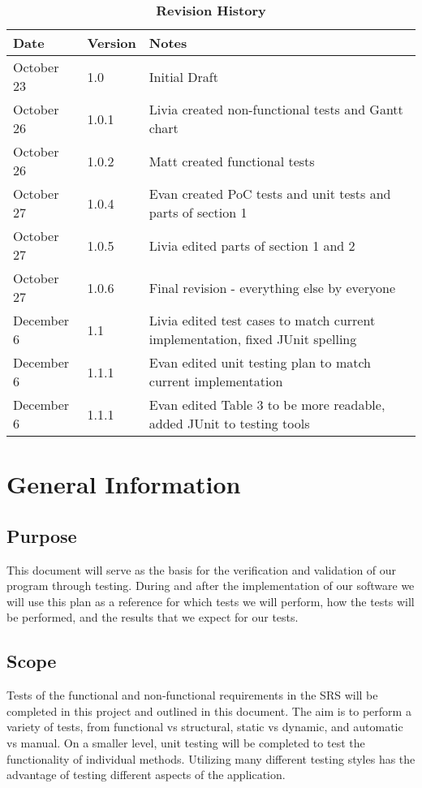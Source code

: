 \begin{table}[H]
\caption{\bf Revision History}
\begin{tabularx}{\textwidth}{p{3cm}p{2cm}X}
\toprule {\bf Date} & {\bf Version} & {\bf Notes}\\
\midrule
October 23 & 1.0 & Initial Draft\\
October 26 & 1.0.1 & Livia created non-functional tests and Gantt chart\\
October 26 & 1.0.2 & Matt created functional tests \\
October 27 & 1.0.4 & Evan created PoC tests and unit tests and parts of section 1\\
October 27 & 1.0.5 & Livia edited parts of section 1 and 2\\
October 27 & 1.0.6 & Final revision - everything else by everyone\\
December 6 & 1.1 & Livia edited test cases to match current implementation, fixed JUnit spelling\\
December 6 & 1.1.1 & Evan edited unit testing plan to match current implementation\\
December 6 & 1.1.1 & Evan edited Table 3 to be more readable, added JUnit to testing tools\\
\bottomrule
\end{tabularx}
\end{table}

\newpage


\section{General Information}

\subsection{Purpose}
This document will serve as the basis for the verification and validation of our program through testing. During and after the implementation of our software we will use this plan as a reference for which tests we will perform, how the tests will be performed, and the results that we expect for our tests.

\subsection{Scope}
Tests of the functional and non-functional requirements in the SRS will be completed in this project and outlined in this document. The aim is to perform a variety of tests, from functional vs structural, static vs dynamic, and automatic vs manual. On a smaller level, unit testing will be completed to test the functionality of individual methods. Utilizing many different testing styles has the advantage of testing different aspects of the application. 

